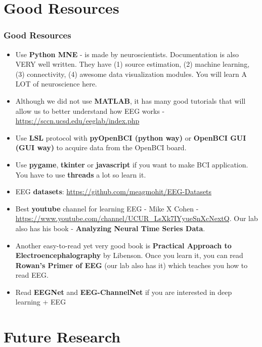 \documentclass{beamer}
\begin{document}
\section{Good Resources}

\begin{frame}
\frametitle{Good Resources}
\footnotesize
\begin{itemize}
	\item Use \textbf{Python MNE} - is made by neuroscientists.  Documentation is also VERY well written.  They have (1) source estimation, (2) machine learning, (3) connectivity,  (4) awesome data visualization modules.   You will learn A LOT of neuroscience here.
	\item Although we did not use \textbf{MATLAB},  it has many good tutorials that will allow us to better understand how EEG works - \url{https://sccn.ucsd.edu/eeglab/index.php}
	\item Use \textbf{LSL} protocol with  \textbf{pyOpenBCI (python way)} or \textbf{OpenBCI GUI (GUI way)} to acquire data from the OpenBCI board.  
	\item Use \textbf{pygame}, \textbf{tkinter} or \textbf{javascript} if you want to make BCI application.  You have to use \textbf{threads} a lot so learn it.
	\item EEG \textbf{datasets}:  \url{https://github.com/meagmohit/EEG-Datasets}
	\item Best \textbf{youtube} channel for learning EEG - Mike X Cohen - \url{https://www.youtube.com/channel/UCUR_LsXk7IYyueSnXcNextQ}.   Our lab also has his book - \textbf{Analyzing Neural Time Series Data}.
	\item Another easy-to-read yet very good book is \textbf{Practical Approach to Electroencephalography} by Libenson.   Once you learn it, you can read \textbf{Rowan's Primer of EEG} (our lab also has it) which teaches you how to read EEG.
	\item Read \textbf{EEGNet} and \textbf{EEG-ChannelNet} if you are interested in deep learning + EEG
\end{itemize}
\end{frame}

\section{Future Research}
\end{document}
